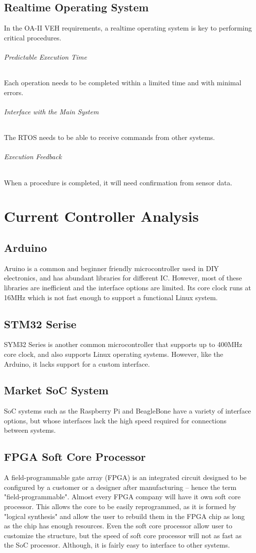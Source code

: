 \documentclass[12pt,article]{memoir}
\begin{document}
\section{Realtime Operating System}
In the OA-II VEH requirements, a realtime operating system is key to performing critical procedures.\cite{wiki:RTOS}
\subparagraph{Predictable Execution Time}Each operation needs to be completed within a limited time and with minimal errors.
\subparagraph{Interface with the Main System}The RTOS needs to be able to receive commands from other systems.
\subparagraph{Execution Feedback}When a procedure is completed, it will need confirmation from sensor data.
\newpage
\chapter{Current Controller Analysis}
\section{Arduino}
Aruino is a common and beginner friendly microcontroller used in DIY electronics, and has abundant libraries for different IC.\cite{offical:Arduino} However, most of these libraries are inefficient and the interface options are limited. Its core clock runs at 16MHz which is not fast enough to support a functional Linux system.
\section{STM32 Serise}
SYM32 Series is another common microcontroller that supports up to 400MHz core clock, and also supports Linux operating systems.\cite{offical:STM32} However, like the Arduino, it lacks support for a custom interface.
\section{Market SoC System}
SoC systems such as the Raspberry Pi and BeagleBone have a variety of interface options, but whose interfaces lack the high speed required for connections between systems.\cite{offical:Beagles}
\section{FPGA Soft Core Processor}
A field-programmable gate array (FPGA) is an integrated circuit designed to be configured by a customer or a designer after manufacturing – hence the term "field-programmable".\cite{wiki:FPGA} Almost every FPGA company will have it own soft core processor. This allows the core to be easily reprogrammed, as it is formed by "logical synthesis" and allow the user to rebuild them in the FPGA chip as long as the chip has enough resources. Even the soft core processor allow user to customize the structure, but the speed of soft core processor will not as fast as the SoC processor. Although, it is fairly easy to interface to other systems.
\end{document}
